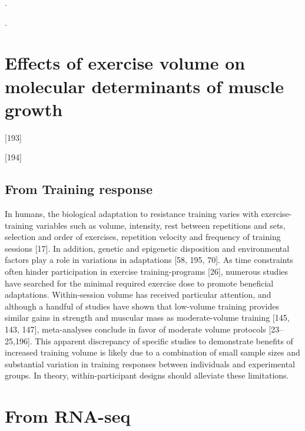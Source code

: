 \documentclass[twoside,10pt]{gihclass} %
\begin{document}
.

.

\hypertarget{effects-of-exercise-volume-on-molecular-determinants-of-muscle-growth}{%
\section{Effects of exercise volume on molecular determinants of muscle growth}\label{effects-of-exercise-volume-on-molecular-determinants-of-muscle-growth}}

{[}193{]}

{[}194{]}

\hypertarget{from-training-response}{%
\subsection{From Training response}\label{from-training-response}}

In humans, the biological adaptation to resistance training varies with exercise-training variables such as volume, intensity, rest between repetitions and sets, selection and order of exercises, repetition velocity and frequency of training sessions {[}17{]}.
In addition, genetic and epigenetic disposition and environmental factors play a role in variations in adaptations
{[}58, 195, 70{]}.
As time constraints often hinder participation in exercise training-programs {[}26{]}, numerous studies have searched for the minimal required exercise dose to promote beneficial adaptations. Within-session volume has received particular attention, and although a handful of studies have shown that low-volume training provides similar gains in strength and muscular mass as moderate-volume training
{[}145, 143, 147{]}, meta-analyses conclude in favor of moderate volume protocols {[}23--25,196{]}.
This apparent discrepancy of specific studies to demonstrate benefits of increased training volume is likely due to a combination of small sample sizes and substantial variation in training responses between individuals and experimental groups. In theory, within-participant designs should alleviate these limitations.

\hypertarget{from-rna-seq}{%
\section{From RNA-seq}\label{from-rna-seq}}
\end{document}
